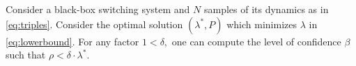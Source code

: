 \begin{theorem}
Consider a black-box switching system and $N$ samples of its dynamics as in \eqref{eq:triples}. Consider the optimal solution $(\lambda^*,P)$ which minimizes $\lambda$ in \eqref{eq:lowerbound}. For any factor $1<\delta,$ one can compute the level of confidence $\beta$ such that $\rho<\delta\cdot\lambda^*.$ 

\end{theorem}